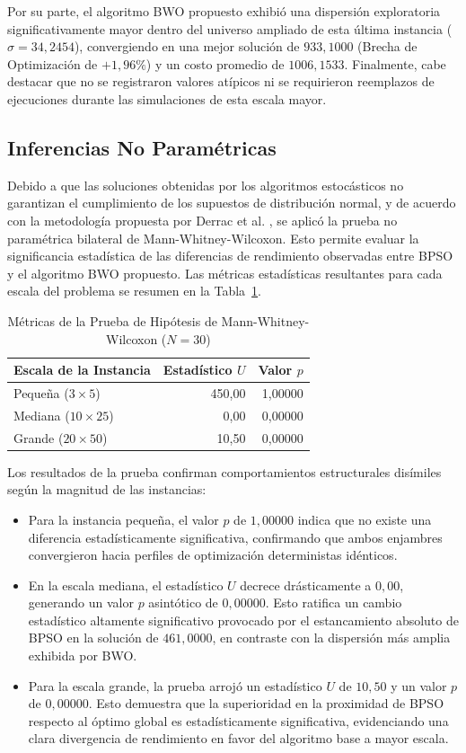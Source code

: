\documentclass[final,5p,times,twocolumn]{elsarticle}
\begin{document}
Por su parte, el algoritmo BWO propuesto exhibió una dispersión exploratoria significativamente mayor dentro del universo ampliado de esta última instancia ($\sigma = 34,2454$), convergiendo en una mejor solución de $933,1000$ (Brecha de Optimización de $+1,96\%$) y un costo promedio de $1006,1533$. Finalmente, cabe destacar que no se registraron valores atípicos ni se requirieron reemplazos de ejecuciones durante las simulaciones de esta escala mayor.

\subsection{Inferencias No Paramétricas}
Debido a que las soluciones obtenidas por los algoritmos estocásticos no garantizan el cumplimiento de los supuestos de distribución normal, y de acuerdo con la metodología propuesta por Derrac et al. \cite{derrac2011practical}, se aplicó la prueba no paramétrica bilateral de Mann-Whitney-Wilcoxon. Esto permite evaluar la significancia estadística de las diferencias de rendimiento observadas entre BPSO y el algoritmo BWO propuesto. Las métricas estadísticas resultantes para cada escala del problema se resumen en la Tabla~\ref{tab:statistical_inference}.

\begin{table}[h]
\centering
\caption{Métricas de la Prueba de Hipótesis de Mann-Whitney-Wilcoxon ($N=30$)}
\label{tab:statistical_inference}
\small
\begin{tabular}{lrr}
\toprule
\textbf{Escala de la Instancia} & \textbf{Estadístico $U$} & \textbf{Valor $p$} \\
\midrule
Pequeña ($3 \times 5$) & 450,00 & 1,00000 \\
Mediana ($10 \times 25$) & 0,00 & 0,00000 \\
Grande ($20 \times 50$) & 10,50 & 0,00000 \\
\bottomrule
\end{tabular}
\end{table}

Los resultados de la prueba confirman comportamientos estructurales disímiles según la magnitud de las instancias:
\begin{itemize}
    \item Para la instancia pequeña, el valor $p$ de $1,00000$ indica que no existe una diferencia estadísticamente significativa, confirmando que ambos enjambres convergieron hacia perfiles de optimización deterministas idénticos.
    \item En la escala mediana, el estadístico $U$ decrece drásticamente a $0,00$, generando un valor $p$ asintótico de $0,00000$. Esto ratifica un cambio estadístico altamente significativo provocado por el estancamiento absoluto de BPSO en la solución de $461,0000$, en contraste con la dispersión más amplia exhibida por BWO.
    \item Para la escala grande, la prueba arrojó un estadístico $U$ de $10,50$ y un valor $p$ de $0,00000$. Esto demuestra que la superioridad en la proximidad de BPSO respecto al óptimo global es estadísticamente significativa, evidenciando una clara divergencia de rendimiento en favor del algoritmo base a mayor escala.
\end{itemize}
\end{document}
